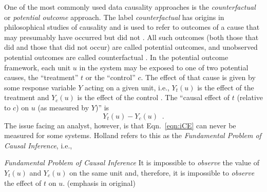 One of the most commonly used data causality approaches is the {\em counterfactual} or {\em potential outcome} approach.  The label {\em counterfactual} has origins in philosophical studies of causality and is used to refer to outcomes of a cause that may presumably have occurred but did not \cite{Illari2014,Imbens2015}.  All such outcomes (both those that did and those that did not occur) are called potential outcomes, and unobserved potential outcomes are called counterfactual \cite{Morgan2014}.  In the potential outcome framework, each unit $u$ in the system may be exposed to one of two potential causes, the ``treatment'' $t$ or the ``control'' $c$.  The effect of that cause is given by some response variable $Y$ acting on a given unit, i.e., $Y_t(u)$ is the effect of the treatment and $Y_c(u)$ is the effect of the control \cite{Holland1986,Morgan2014,Imbens2015}.  The ``causal effect of $t$ (relative to $c$) on $u$ (as measured by $Y$)'' \cite{Holland1986} is
\begin{equation}
\label{eqn:iCE}
Y_t(u)-Y_c(u)\;\;.
\end{equation}
The issue facing an analyst, however, is that Eqn.\ \ref{eqn:iCE} can never be measured for some systems.  Holland refers to this as the {\em Fundamental Problem of Causal Inference}, i.e.,
\begin{mydef}
{\em Fundamental Problem of Causal Inference} It is impossible to {\em observe} the value of $Y_t(u)$ and $Y_c(u)$ on the same unit and, therefore, it is impossible to {\em observe} the effect of $t$ on $u$. \cite{Holland1986} (emphasis in original)
\end{mydef}

